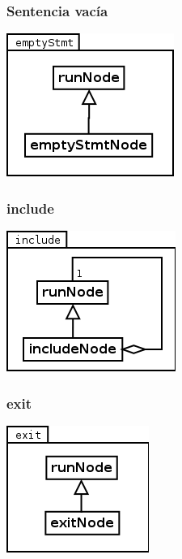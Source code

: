 \subsubsection{Sentencia vacía}
\begin{center}
\includegraphics[scale=0.4]{emptyStmt.png} \\
\end{center}

\subsubsection{include}
\begin{center}
\includegraphics[scale=0.4]{include.png} \\
\end{center}

\subsubsection{exit}
\begin{center}
\includegraphics[scale=0.4]{exit.png} \\
\end{center}

